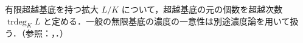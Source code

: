 \begin{defn}[有限超越次数]
有限超越基底を持つ拡大 $L/K$ について，超越基底の元の個数を超越次数 $\operatorname{trdeg}_K L$ と定める．一般の無限基底の濃度の一意性は別途濃度論を用いて扱う．（参照：，．）
\end{defn}
